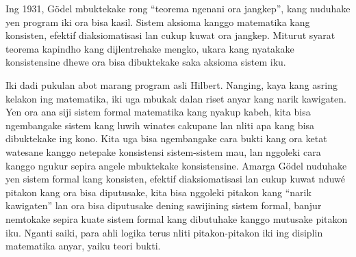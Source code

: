 \documentclass[../../../include/open-logic-section]{subfiles}
\begin{document}
Ing 1931, G\"odel mbuktekake rong ``teorema ngenani
ora jangkep'', kang nuduhake yen program iki ora
bisa kasil.
Sistem aksioma kanggo matematika kang konsisten, efektif
diaksiomatisasi lan cukup kuwat ora jangkep. Miturut
syarat teorema kapindho kang dijlentrehake mengko,
ukara kang nyatakake konsistensine dhewe ora bisa
dibuktekake saka aksioma sistem iku.

Iki dadi pukulan abot marang program asli Hilbert.
Nanging, kaya kang asring kelakon ing matematika,
iki uga mbukak dalan riset anyar kang narik kawigaten.
Yen ora ana siji sistem formal matematika kang
nyakup kabeh, kita bisa ngembangake sistem kang
luwih winates cakupane lan nliti apa kang bisa
dibuktekake ing kono. Kita uga bisa ngembangake
cara bukti kang ora ketat watesane kanggo
netepake konsistensi sistem-sistem mau, lan
nggoleki cara kanggo ngukur sepira angele
mbuktekake konsistensine. Amarga G\"odel nuduhake
yen sistem formal kang konsisten, efektif diaksiomatisasi
lan cukup kuwat nduwé pitakon
kang ora bisa diputusake, kita bisa nggoleki
pitakon kang ``narik kawigaten'' lan ora bisa
diputusake dening sawijining sistem formal,
banjur nemtokake sepira kuate sistem formal
kang dibutuhake kanggo mutusake pitakon iku.
Nganti saiki, para ahli logika terus nliti
pitakon-pitakon iki ing disiplin matematika
anyar, yaiku teori bukti.
\end{document}
